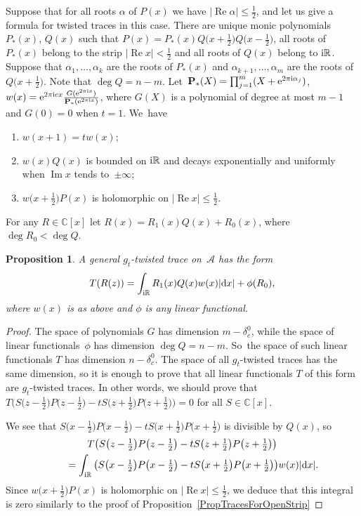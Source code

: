 \documentclass[pdftex]{sigma}
\newcommand{\RN}{\mathbb{R}} %
\newcommand{\CN}{\mathbb{C}} %
\renewcommand{\Im}{\mathop{\mathrm{Im}}\nolimits}
\newcommand{\mc}[1]{\mathcal{#1}}
\renewcommand{\Re}{\operatorname{Re}}
\newcommand{\bP}{\mathbf{P}}
\newtheorem{Proposition}[Theorem]{Proposition}
\theoremstyle{definition}
\numberwithin{equation}{section}
\begin{document}
Suppose that for all roots $\alpha$ of $P(x)$ we have $|\Re\alpha|\leq \frac{1}{2}$, and let us give a formula for twisted traces in this case.
 There are unique monic polynomials $P_*(x)$, $Q(x)$ such that $P(x)=P_*(x)Q\big(x+\frac{1}{2}\big)Q\big(x-\tfrac{1}{2}\big)$, all roots of $P_*(x)$ belong to the strip $|\Re x|<\frac{1}{2}$ and all roots of $Q(x)$ belong to ${\rm i}\RN$. Suppose that $\alpha_1,\ldots,\alpha_k$ are the roots of $P_*(x)$ and $\alpha_{k+1},\ldots,\alpha_m$ are the roots of~$Q\big(x+\frac{1}{2}\big)$. Note that $\deg Q=n-m$. Let~$\bP_*(X)=\prod_{j=1}^m(X+{\rm e}^{2\pi {\rm i}\alpha_j})$, $w(x)={\rm e}^{2\pi {\rm i}cx}\frac{G({\rm e}^{2\pi {\rm i} x})}{\bP_*({\rm e}^{2\pi {\rm i} x})}$, where $G(X)$ is a polynomial of degree at most $m-1$ and $G(0)=0$ when $t=1$. We~have
\begin{enumerate}\itemsep=0pt
\item[(1)]
$w(x+1)=tw(x)$;
\item[(2)]
$w(x)Q(x)$ is bounded on ${\rm i}\RN$ and decays exponentially and uniformly when $\Im x$ tends to~$\pm \infty$;
\item[(3)]
$w\big(x+\frac{1}{2}\big)P(x)$ is holomorphic on $|\Re x|\leq \frac{1}{2}$.
\end{enumerate}
For any $R\in \CN[x]$ let $R(x)=R_1(x)Q(x)+R_0(x)$, where $\deg R_0<\deg Q$.
\begin{Proposition}
\label{PropTracesForClosedStrip}
A general $g_t$-twisted trace on~$\mc A$
has the form
\[T(R(z))=\int_{{\rm i}\RN}R_1(x)Q(x)w(x)|{\rm d}x|+\phi(R_0),\] where $w(x)$ is as above and $\phi$ is any linear functional.
\end{Proposition}
\begin{proof}
The space of polynomials $G$ has dimension $m-\delta_c^0$, while the space of linear functionals~$\phi$ has dimension $\deg Q=n-m$. So~the space of such linear functionals $T$ has dimension $n-\delta_c^0$. The space of all $g_t$-twisted traces has the same dimension, so it is enough to prove that all linear functionals $T$ of this form are $g_t$-twisted traces. In other words, we should prove that $T\big(S\big(z-\frac{1}{2}\big)P\big(z-\frac{1}{2}\big)-tS\big(z+\frac{1}{2}\big)P\big(z+\frac{1}{2}\big)\big)=0$ for all $S\in\CN[x]$.

We see that $S\big(x-\tfrac{1}{2}\big)P\big(x-\tfrac{1}{2}\big)-tS\big(x+\frac{1}{2}\big)P\big(x+\frac{1}{2}\big)$ is divisible by $Q(x)$, so
\begin{gather*}
T\big(S\big(z-\tfrac{1}{2}\big)P\big(z-\tfrac{1}{2}\big)-tS\big(z+\tfrac{1}{2}\big)
P\big(z+\tfrac{1}{2}\big)\big)
\\ \qquad
{}= \int_{{\rm i}\RN}\big(S\big(x-\tfrac{1}{2}\big)P\big(x-\tfrac{1}{2}\big)-tS\big(x+\tfrac{1}{2}\big)
P\big(x+\tfrac{1}{2}\big)\big)w(x)|{\rm d}x|.
\end{gather*}
Since $w\big(x+\frac{1}{2}\big)P(x)$ is holomorphic on $|\Re x|\leq \frac{1}{2}$, we deduce that this integral is zero similarly to the proof of Proposition~\ref{PropTracesForOpenStrip}
\end{proof}
\end{document}
